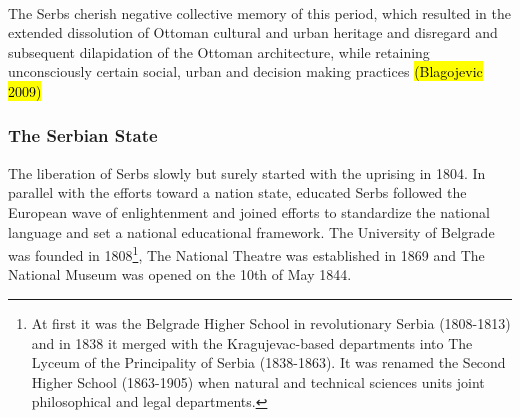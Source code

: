 \documentclass[11pt]{report}
\begin{document}
\\
The Serbs cherish negative collective memory of this period, which resulted in the extended dissolution of Ottoman cultural and urban heritage and disregard and subsequent dilapidation of the Ottoman architecture, while retaining unconsciously certain social, urban and decision making practices \hl{(Blagojevic 2009)}

\subsubsection{The Serbian State}

The liberation of Serbs slowly but surely started with the uprising in 1804.
In parallel with the efforts toward a nation state, educated Serbs followed the European wave of enlightenment and joined efforts to standardize the national language and set a national educational framework. The University of Belgrade was founded in 1808\footnote{At first it was the Belgrade Higher School in revolutionary Serbia (1808-1813) and in 1838 it merged with the Kragujevac-based departments into The Lyceum of the Principality of Serbia (1838-1863). It was renamed the Second Higher School (1863-1905) when natural and technical sciences units joint philosophical and legal departments.}, The National Theatre was established in 1869 and The National Museum was opened on the 10th of May 1844.
\end{document}
